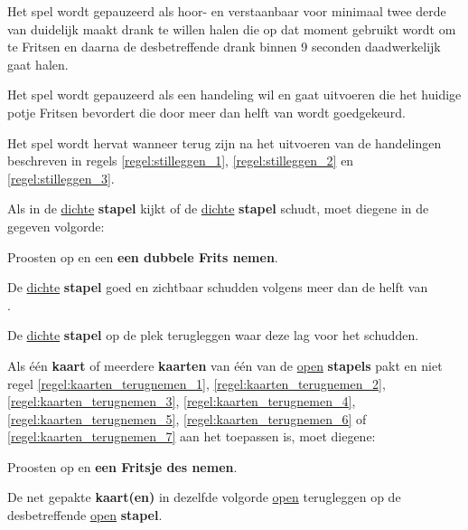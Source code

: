 \vervolgLijst{}
\item Het spel wordt gepauzeerd als \eenSpeler hoor- en verstaanbaar voor minimaal twee derde van \alleSpelers duidelijk maakt drank te willen halen die op dat moment gebruikt wordt om te Fritsen en daarna de desbetreffende drank binnen 9 seconden daadwerkelijk gaat halen.
\label{regel:stilleggen_2}
\eindLijst{}

\vervolgLijst{}
\item Het spel wordt gepauzeerd als \eenSpeler een handeling wil en gaat uitvoeren die het huidige potje Fritsen bevordert die door meer dan helft van \alleSpelers wordt goedgekeurd.
\label{regel:stilleggen_3}
\eindLijst{}

\vervolgLijst{}
\item Het spel wordt hervat wanneer \alleSpelers terug zijn na het uitvoeren van de handelingen beschreven in regels \ref{regel:stilleggen_1}, \ref{regel:stilleggen_2} en \ref{regel:stilleggen_3}.
\label{regel:stilleggen_4}
\eindLijst{}


\vervolgLijst{}
\item Als \eenSpeler in de \ul{dichte} \textbf{stapel} kijkt of de \ul{dichte} \textbf{stapel} schudt, moet diegene in de gegeven volgorde:
\puntLijst{}
\item Proosten op  en een \textbf{een dubbele Frits nemen}\footnotemark[1].
\item De \ul{dichte} \textbf{stapel} goed en zichtbaar schudden volgens meer dan de helft van \\ \alleSpelersN.
\item De \ul{dichte} \textbf{stapel} op de plek terugleggen waar deze lag voor het schudden.
\eindPuntLijst{}
\label{regel:kijken_in_dichte_stapel}
\eindLijst{}

\vervolgLijst{}
\item Als \eenSpeler één \textbf{kaart} of meerdere \textbf{kaarten} van één van de \ul{open} \textbf{stapels} pakt en niet regel \ref{regel:kaarten_terugnemen_1}, \ref{regel:kaarten_terugnemen_2}, \ref{regel:kaarten_terugnemen_3}, \ref{regel:kaarten_terugnemen_4}, \ref{regel:kaarten_terugnemen_5}, \ref{regel:kaarten_terugnemen_6} of \ref{regel:kaarten_terugnemen_7} aan het toepassen is, moet diegene:
\puntLijst{}
\item Proosten op  en \textbf{een Fritsje des nemen}\footnotemark[2].
\item De net gepakte \textbf{kaart(en)} in dezelfde volgorde \ul{open} terugleggen op de desbetreffende \ul{open} \textbf{stapel}.
\eindPuntLijst{}
\eindLijst{}


